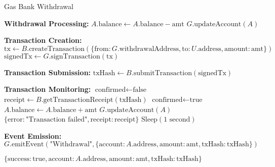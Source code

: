 \begin{tcolorbox}
\begin{tcolorbox}
\begin{tcolorbox}
\begin{protocol}{Gas Bank Withdrawal}
\begin{algorithmic}[1]
\State \textbf{Withdrawal Processing:}
\State $A.\text{balance} \gets A.\text{balance} - \text{amt}$
\State $G.\text{updateAccount}(A)$

\State \textbf{Transaction Creation:}
\State $\text{tx} \gets B.\text{createTransaction}(\{\text{from}: G.\text{withdrawalAddress}, \text{to}: U.\text{address}, \text{amount}: \text{amt}\})$
\State $\text{signedTx} \gets G.\text{signTransaction}(\text{tx})$

\State \textbf{Transaction Submission:}
\State $\text{txHash} \gets B.\text{submitTransaction}(\text{signedTx})$

\State \textbf{Transaction Monitoring:}
\State $\text{confirmed} \gets \text{false}$
    \State $\text{receipt} \gets B.\text{getTransactionReceipt}(\text{txHash})$
            \State $\text{confirmed} \gets \text{true}$
            \State $A.\text{balance} \gets A.\text{balance} + \text{amt}$ 
            \State $G.\text{updateAccount}(A)$
            \State \Return $\{\text{error}: \text{"Transaction failed"}, \text{receipt}: \text{receipt}\}$
        \EndIf
    \EndIf
        \State $\text{Sleep}(1\text{ second})$
    \EndIf
\EndWhile

\State \textbf{Event Emission:}
\State $G.\text{emitEvent}(\text{"Withdrawal"}, \{\text{account}: A.\text{address}, \text{amount}: \text{amt}, \text{txHash}: \text{txHash}\})$

\State \Return $\{\text{success}: \text{true}, \text{account}: A.\text{address}, \text{amount}: \text{amt}, \text{txHash}: \text{txHash}\}$
\end{algorithmic}
\end{protocol}
\end{tcolorbox}



\end{tcolorbox}
\end{tcolorbox}
